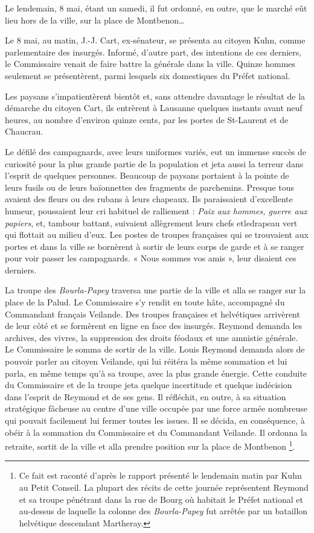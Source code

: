 \documentclass[french,twoside]{book} %
\begin{document}
\noindent Le lendemain, 8 mai, étant un samedi, il fut ordonné, en outre, que le marché eût lieu hors de la ville, sur la place de Montbenon…\par
Le 8 mai, au matin, J.-J. Cart, ex-sénateur, se présenta au citoyen Kuhn, comme parlementaire des insurgés. Informé, d’autre part, des intentions de ces derniers, le Commissaire venait de faire battre la générale dans la ville. Quinze hommes seulement se présentèrent, parmi lesquels six domestiques du Préfet national.\par
Les paysans s’impatientèrent bientôt et, sans attendre davantage le résultat de la démarche du citoyen Cart, ils entrèrent à Lausanne quelques instants avant neuf heures, au nombre d’environ quinze cents, par les portes de St-Laurent et de Chaucrau.\par
Le défilé des campagnards, avec leurs uniformes variés, eut un immense succès de curiosité pour la plus grande partie de la population et jeta aussi la terreur dans l’esprit de quelques personnes. Beaucoup de paysans portaient à la pointe de leurs fusils ou de leurs baïonnettes des fragments de parchemins. Presque tous avaient des fleurs ou des rubans à leurs chapeaux. Ils paraissaient d’excellente humeur, poussaient leur cri habituel de ralliement : \emph{Paix aux hommes, guerre aux papiers}, et, tambour battant, suivaient allègrement leurs chefs etledrapeau vert qui flottait au milieu d’eux. Les postes de troupes françaises qui se trouvaient aux portes et dans la ville se bornèrent à sortir de leurs corps de garde et à se ranger pour voir passer les campagnards. « Nous sommes vos amis », leur disaient ces derniers.\par
La troupe des \emph{Bourla-Papey} traversa une partie de la ville et alla se ranger sur la place de la Palud. Le Commissaire s’y rendit en toute hâte, accompagné du Commandant français Veilande. Des troupes françaises et helvétiques arrivèrent de leur côté et se formèrent en ligne en face des insurgés. Reymond demanda les archives, des vivres, la suppression des droits féodaux et une amnistie générale. Le Commissaire le somma de sortir de la ville. Louis Reymond demanda alors de pouvoir parler au citoyen Veilande, qui lui réitéra la même sommation et lui parla, en même temps qu’à sa troupe, avec la plus grande énergie. Cette conduite du Commissaire et de la troupe jeta quelque incertitude et quelque indécision dans l’esprit de Reymond et de ses gens. Il réfléchit, en outre, à sa situation stratégique fâcheuse au centre d’une ville occupée par une force armée nombreuse qui pouvait facilement lui fermer toutes les issues. Il se décida, en conséquence, à obéir à la sommation du Commissaire et du Commandant Veilande. Il ordonna la retraite, sortit de la ville et alla prendre position sur la place de Montbenon \footnote{Ce fait est raconté d’après le rapport présenté le lendemain matin par Kuhn au Petit Conseil. La plupart des récits de cette journée représentent Reymond et sa troupe pénétrant dans la rue de Bourg où habitait le Préfet national et au-dessus de laquelle la colonne des \emph{Bourla-Papey} fut arrêtée par un bataillon helvétique descendant Martheray.}.\par
\end{document}
